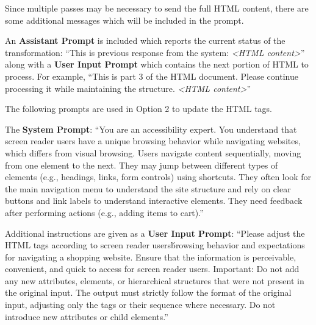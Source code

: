 Since multiple passes may be necessary to send the full HTML content, there are some additional messages which will be included in the prompt.

An \textbf{Assistant Prompt} is included which reports the current status of the transformation: ``This is previous response from the system: \textit{<HTML content>}'' along with a \textbf{User Input Prompt} which contains the next portion of HTML to process. For example, ``This is part 3 of the HTML document. Please continue processing it while maintaining the structure. \textit{<HTML content>}''


The following prompts are used in Option 2 to update the HTML tags.

The \textbf{System Prompt}: ``You are an accessibility expert. You understand that screen reader users have a unique browsing behavior while navigating websites, which differs from visual browsing. Users navigate content sequentially, moving from one element to the next. They may jump between different types of elements (e.g., headings, links, form controls) using shortcuts. They often look for the main navigation menu to understand the site structure and rely on clear buttons and link labels to understand interactive elements. They need feedback after performing actions (e.g., adding items to cart).''

Additional instructions are given as a \textbf{User Input Prompt}: ``Please adjust the HTML tags according to screen reader users\' browsing behavior and expectations for navigating a shopping website. Ensure that the information is perceivable, convenient, and quick to access for screen reader users. Important: Do not add any new attributes, elements, or hierarchical structures that were not present in the original input. The output must strictly follow the format of the original input, adjusting only the tags or their sequence where necessary. Do not introduce new attributes or child elements.''

